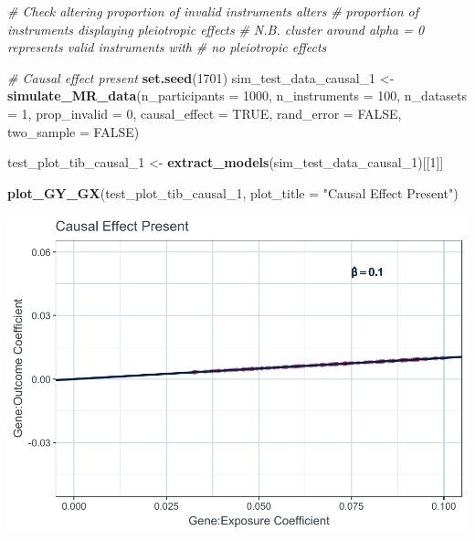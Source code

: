 \documentclass[
]{article}
\newenvironment{Shaded}{\begin{snugshade}}{\end{snugshade}}
\newcommand{\AttributeTok}[1]{\textcolor[rgb]{0.13,0.29,0.53}{#1}}
\newcommand{\CommentTok}[1]{\textcolor[rgb]{0.56,0.35,0.01}{\textit{#1}}}
\newcommand{\ConstantTok}[1]{\textcolor[rgb]{0.56,0.35,0.01}{#1}}
\newcommand{\DecValTok}[1]{\textcolor[rgb]{0.00,0.00,0.81}{#1}}
\newcommand{\FunctionTok}[1]{\textcolor[rgb]{0.13,0.29,0.53}{\textbf{#1}}}
\newcommand{\NormalTok}[1]{#1}
\newcommand{\OtherTok}[1]{\textcolor[rgb]{0.56,0.35,0.01}{#1}}
\newcommand{\StringTok}[1]{\textcolor[rgb]{0.31,0.60,0.02}{#1}}
\begin{document}
\begin{Shaded}
\begin{Highlighting}[]
\CommentTok{\# Check altering proportion of invalid instruments alters}
\CommentTok{\# proportion of instruments displaying pleiotropic effects}
\CommentTok{\# N.B. cluster around alpha = 0 represents valid instruments with}
\CommentTok{\# no pleiotropic effects}


\CommentTok{\# Causal effect present}
 \FunctionTok{set.seed}\NormalTok{(}\DecValTok{1701}\NormalTok{)}
\NormalTok{ sim\_test\_data\_causal\_1 }\OtherTok{\textless{}{-}} \FunctionTok{simulate\_MR\_data}\NormalTok{(}\AttributeTok{n\_participants =} \DecValTok{1000}\NormalTok{,}
                                            \AttributeTok{n\_instruments =} \DecValTok{100}\NormalTok{,}
                                            \AttributeTok{n\_datasets =} \DecValTok{1}\NormalTok{,}
                                            \AttributeTok{prop\_invalid =} \DecValTok{0}\NormalTok{,}
                                            \AttributeTok{causal\_effect =} \ConstantTok{TRUE}\NormalTok{,}
                                            \AttributeTok{rand\_error =} \ConstantTok{FALSE}\NormalTok{,}
                                            \AttributeTok{two\_sample =} \ConstantTok{FALSE}\NormalTok{)}

\NormalTok{ test\_plot\_tib\_causal\_1 }\OtherTok{\textless{}{-}} \FunctionTok{extract\_models}\NormalTok{(sim\_test\_data\_causal\_1)[[}\DecValTok{1}\NormalTok{]]}

 \FunctionTok{plot\_GY\_GX}\NormalTok{(test\_plot\_tib\_causal\_1, }\AttributeTok{plot\_title =} \StringTok{"Causal Effect Present"}\NormalTok{)}
\end{Highlighting}
\end{Shaded}

\includegraphics{9_Test_Appendices_files/figure-latex/test-plot-causal-1.pdf}
\end{document}
